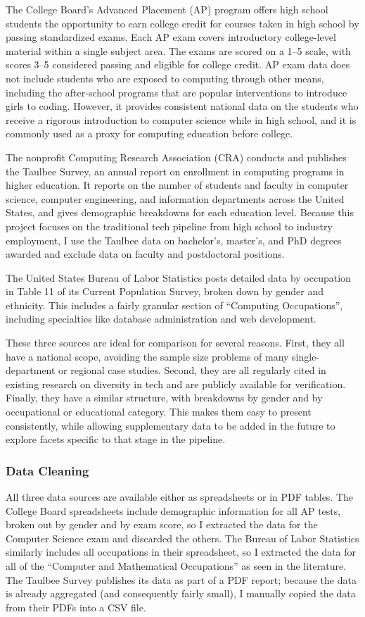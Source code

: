 The College Board's Advanced Placement (AP) program offers high school students the opportunity to earn college credit for courses taken in high school by passing standardized exams. Each AP exam covers introductory college-level material within a single subject area. The exams are scored on a 1--5 scale, with scores 3--5 considered passing and eligible for college credit. AP exam data does not include students who are exposed to computing through other means, including the after-school programs that are popular interventions to introduce girls to coding. However, it provides consistent national data on the students who receive a rigorous introduction to computer science while in high school, and it is commonly used as a proxy for computing education before college.

The nonprofit Computing Research Association (CRA) conducts and publishes the Taulbee Survey, an annual report on enrollment in computing programs in higher education. It reports on the number of students and faculty in computer science, computer engineering, and information departments across the United States, and gives demographic breakdowns for each education level. Because this project focuses on the traditional tech pipeline from high school to industry employment, I use the Taulbee data on bachelor's, master's, and PhD degrees awarded and exclude data on faculty and postdoctoral positions.

The United States Bureau of Labor Statistics posts detailed data by occupation in Table 11 of its Current Population Survey, broken down by gender and ethnicity. This includes a fairly granular section of ``Computing Occupations'', including specialties like database administration and web development.

These three sources are ideal for comparison for several reasons. First, they all have a national scope, avoiding the sample size problems of many single-department or regional case studies. Second, they are all regularly cited in existing research on diversity in tech and are publicly available for verification. Finally, they have a similar structure, with breakdowns by gender and by occupational or educational category. This makes them easy to present consistently, while allowing supplementary data to be added in the future to explore facets specific to that stage in the pipeline.

\subsubsection{Data Cleaning}
All three data sources are available either as spreadsheets or in PDF tables. The College Board spreadsheets include demographic information for all AP tests, broken out by gender and by exam score, so I extracted the data for the Computer Science exam and discarded the others. The Bureau of Labor Statistics similarly includes all occupations in their spreadsheet, so I extracted the data for all of the ``Computer and Mathematical Occupations'' as seen in the literature. The Taulbee Survey publishes its data as part of a PDF report; because the data is already aggregated (and consequently fairly small), I manually copied the data from their PDFs into a CSV file.

